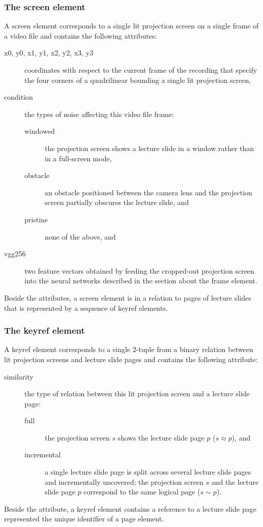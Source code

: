 \subsubsection*{The screen element}
A screen element corresponds to a single lit projection screen on a single
frame of a video file and contains the following attributes:
\begin{description}
  \item[x0\textmd, y0\textmd, x1\textmd, y1\textmd, x2\textmd, y2\textmd,
        x3\textmd, y3] coordinates with respect to the current frame
    of the recording that specify the four corners of a quadrilinear
    bounding a single lit projection screen,
  \item[condition] the types of noise affecting this video file frame:
    \begin{description}
      \item[windowed] the projection screen shows a lecture slide in a window
        rather than in a full-screen mode,
      \item[obstacle] an obstacle positioned between the camera lens and the
        projection screen partially obscures the lecture slide, and
      \item[pristine] none of the above, and
    \end{description}
  \item[vgg256] two  feature vectors obtained by feeding the
    cropped-out projection screen into the neural networks described in
    the section about the frame element.
\end{description}
Beside the attributes, a screen element is in a relation to pages of lecture
slides that is represented by a sequence of keyref elements.

\subsubsection*{The keyref element}
A keyref element corresponds to a single 2-tuple from a binary relation between
lit projection screens and lecture slide pages and contains the following
attribute:
\begin{description}
  \item[similarity] the type of relation between this lit projection screen and
    a lecture slide page:
    \begin{description}
      \item[full] the projection screen $s$ shows the lecture slide page $p$
        ($s\approx p$), and
      \item[incremental] a single  lecture slide page is split
        across several lecture slide pages and incrementally uncovered; the
        projection screen $s$ and the lecture slide page $p$ correspond to the
        same logical page ($s\sim p$).
    \end{description}
\end{description}
Beside the attribute, a keyref element contains a reference to a lecture slide
page represented the unique identifier of a page element.

